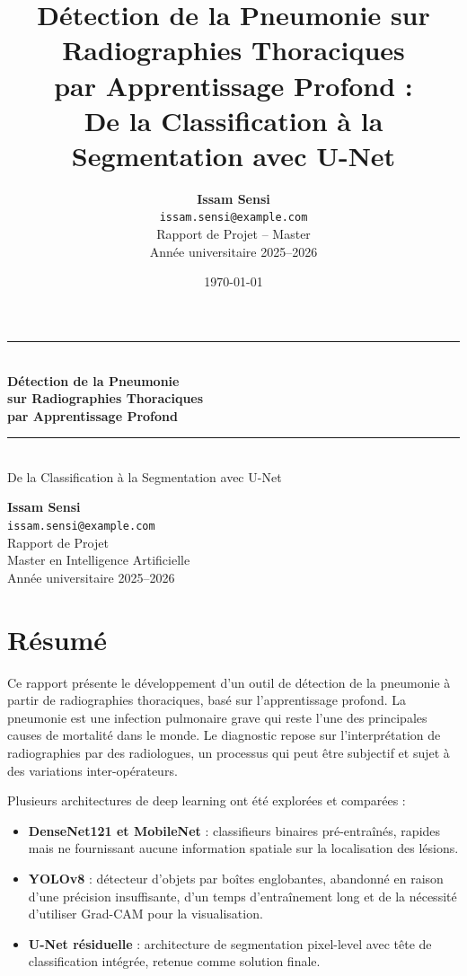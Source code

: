 \documentclass[12pt,a4paper,twoside]{report}
\title{
  \vspace*{3cm}
  \Huge\textbf{Détection de la Pneumonie sur Radiographies Thoraciques}\\[0.8cm]
  \Large\textbf{par Apprentissage Profond :}\\[0.3cm]
  \Large{De la Classification à la Segmentation avec U-Net}\\[2cm]
  \vspace*{1cm}
}
\author{
  \textbf{Issam Sensi}\\[0.3cm]
  \texttt{issam.sensi@example.com}\\[1cm]
  \large{Rapport de Projet -- Master}\\[0.3cm]
  \large{Année universitaire 2025--2026}
}
\date{\today}
\begin{document}
\begin{titlepage}
\centering
\vspace*{2cm}

\rule{\textwidth}{1pt}\\[0.3cm]
{\Huge\textbf{Détection de la Pneumonie\\[0.3cm] sur Radiographies Thoraciques\\[0.3cm] par Apprentissage Profond}}\\[0.3cm]
\rule{\textwidth}{1pt}\\[0.8cm]

{\large De la Classification à la Segmentation avec U-Net}\\[1.5cm]

\vspace*{2cm}

{\large\textbf{Issam Sensi}}\\[0.3cm]
{\large\texttt{issam.sensi@example.com}}\\[1.5cm]

{\large Rapport de Projet}\\[0.3cm]
{\large Master en Intelligence Artificielle}\\[0.3cm]
{\large Année universitaire 2025--2026}\\[2cm]

\vfill
\end{titlepage}

\chapter*{Résumé}

Ce rapport présente le développement d'un outil de détection de la pneumonie à partir de radiographies thoraciques, basé sur l'apprentissage profond. La pneumonie est une infection pulmonaire grave qui reste l'une des principales causes de mortalité dans le monde. Le diagnostic repose sur l'interprétation de radiographies par des radiologues, un processus qui peut être subjectif et sujet à des variations inter-opérateurs.

Plusieurs architectures de deep learning ont été explorées et comparées :
\begin{itemize}
  \item \textbf{DenseNet121 et MobileNet} : classifieurs binaires pré-entraînés, rapides mais ne fournissant aucune information spatiale sur la localisation des lésions.
  \item \textbf{YOLOv8} : détecteur d'objets par boîtes englobantes, abandonné en raison d'une précision insuffisante, d'un temps d'entraînement long et de la nécessité d'utiliser Grad-CAM pour la visualisation.
  \item \textbf{U-Net résiduelle} : architecture de segmentation pixel-level avec tête de classification intégrée, retenue comme solution finale.
\end{itemize}
\end{document}
